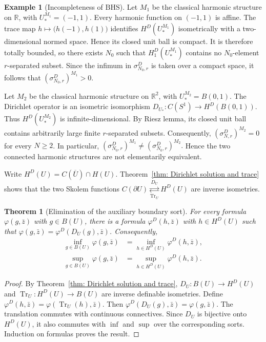 \documentclass{amsart}
\newtheorem{theorem}{Theorem}[section]
\theoremstyle{definition}
\newtheorem{example}{Example}[section]
\theoremstyle{remark}
\numberwithin{equation}{section}
\begin{document}
\begin{example}[Incompleteness of $\mathrm{BHS}$]
	Let $M_1$ be the classical harmonic structure on
	$\mathbb R$, with
	$U_*^{M_1}=(-1,1)$.
	Every harmonic function on $(-1,1)$ is affine. The trace map
	$h\mapsto\bigl(h(-1),h(1)\bigr)$
	identifies $H^D(U_*^{M_1})$ isometrically with a
	two-dimensional normed space. Hence its closed unit ball is compact.
	It is therefore totally bounded, so there exists $N_0$ such that
	$H^D_1(U_*^{M_1})$ contains no $N_0$-element
	$r$-separated subset. Since the infimum in
	$\sigma^D_{N_0,r}$ is taken over a compact space, it follows that
	$(\sigma^D_{N_0,r})^{M_1}>0$.
	
	Let $M_2$ be the classical harmonic structure on
	$\mathbb R^2$, with
	$U_*^{M_2}=B(0,1)$.
	The Dirichlet operator is an isometric isomorphism
	$D_{U_*}:C(S^1)\to H^D(B(0,1))$.
	Thus $H^D(U_*^{M_2})$ is infinite-dimensional. By Riesz
	lemma, its closed unit ball contains arbitrarily large finite
	$r$-separated subsets. Consequently,
	$(\sigma^D_{N,r})^{M_2}=0$
	for every $N\ge2$. In particular,
	$(\sigma^D_{N_0,r})^{M_1}
	\neq
	(\sigma^D_{N_0,r})^{M_2}.$
	Hence the two connected harmonic structures are not elementarily
	equivalent.
\end{example}


Write $H^D(U)=C(\overline U)\cap H(U)$. Theorem~\ref{thm: Dirichlet solution and trace} shows that the two Skolem functions $C(\partial U)
\underset{\operatorname{Tr}_U}{\overset{D_U}{\rightleftarrows}}
H^D(U)$ are inverse isometries.

\begin{theorem}[Elimination of the auxiliary boundary sort]
	\label{thm:boundary-sort-elimination}
	For every formula $\varphi(g,\bar z)$ with $g\in B(U)$, there is a formula $\varphi^D(h,\bar z)$ with $h\in H^D(U)$ such that $\varphi(g,\bar z)=\varphi^D(D_U(g),\bar z)$.
	Consequently,
	$$\begin{aligned}
	    \inf_{g\in B(U)}\varphi(g,\bar z)&=\inf_{h\in H^D(U)}\varphi^D(h,\bar z),\\
        \sup_{g\in B(U)}\varphi(g,\bar z)& =\sup_{h\in H^D(U)}\varphi^D(h,\bar z).
	\end{aligned}$$
\end{theorem}
\begin{proof}
	By Theorem~\ref{thm: Dirichlet solution and trace}, $D_U:B(U)\to H^D(U)$ and $\operatorname{Tr}_U:H^D(U)\to B(U)$ are inverse definable isometries. Define $\varphi^D(h,\bar z)=\varphi(\operatorname{Tr}_U(h),\bar z)$. Then $\varphi^D(D_U(g),\bar z)=\varphi(g,\bar z)$. The translation commutes with continuous connectives. Since $D_U$ is bijective onto $H^D(U)$, it also commutes with $\inf$ and $\sup$ over the corresponding sorts. Induction on formulas proves the result.
\end{proof}
\end{document}
